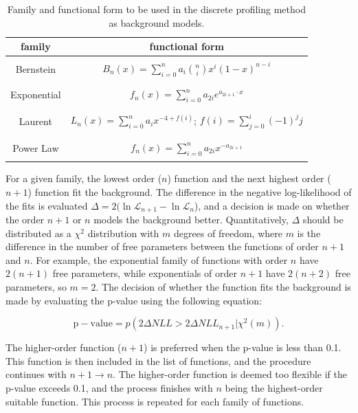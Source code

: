 \begin{table}[h]
    \centering
    \begin{tabular}{|c|c|}
        \hline
        family & functional form \\ \hline \hline
        & \\
        Bernstein & $B_n(x) = \sum_{i=0}^n a_i \binom{n}{i} x^i (1-x)^{n-i}$  \\
        & \\ \hline
        & \\
        Exponential & $f_n(x) = \sum_{i=0}^n a_{2i} e^{a_{2i+1} \cdot x}$\\
        & \\ \hline
        & \\
        Laurent & $L_n(x) = \sum_{i=0}^n a_i x^{-4 + f(i)}$; $f(i) = \sum_{j=0}^i (-1)^j j$ \\
        & \\ \hline
        & \\
        Power Law & $f_n(x) = \sum_{i=0}^n a_{2i} x^{-a_{2i+1}} $ \\
        & \\ \hline
    \end{tabular}
    \caption[Background modeling functions]{Family and functional form to be used in the discrete profiling method as background models.}
    \label{tab:bkg_functions}
\end{table}

For a given family, the lowest order ($n$) function and the next highest order ($n+1$) function fit the background. The difference in the negative log-likelihood of the fits is evaluated $\Delta = 2(\ln \mathcal{L}_{n+1} - \ln \mathcal{L}_{n}$), and a decision is made on whether the order $n+1$ or $n$ models the background better. Quantitatively, $\Delta$ should be distributed as a $\chi^2$ distribution with $m$ degrees of freedom, where $m$ is the difference in the number of free parameters between the functions of order $n+1$ and $n$. For example, the exponential family of functions with order $n$ have $2(n+1)$ free parameters, while exponentials of order $n+1$ have $2(n+2)$ free parameters, so $m=2$. The decision of whether the function fits the background is made by evaluating the p-value using the following equation:

\begin{equation}
    \mathrm{p-value} = p(2\Delta NLL > 2\Delta NLL_{n+1} | \chi^2(m)).
\end{equation}

The higher-order function ($n+1$) is preferred when the p-value is less than 0.1. This function is then included in the list of functions, and the procedure continues with $n+1 \rightarrow n$. The higher-order function is deemed too flexible if the p-value exceeds 0.1, and the process finishes with $n$ being the highest-order suitable function. This process is repeated for each family of functions.

